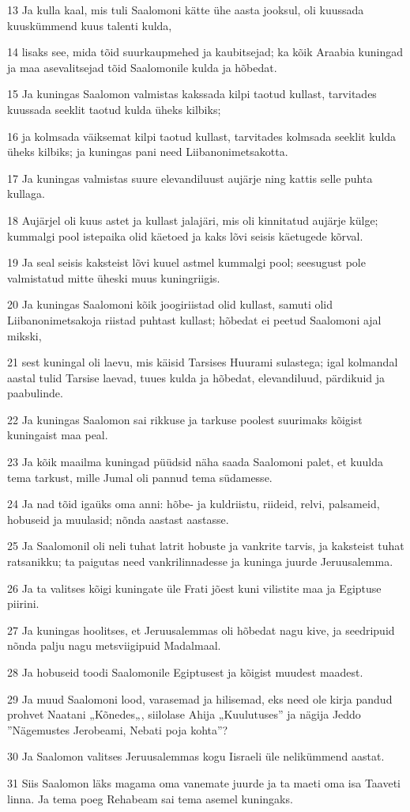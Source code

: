 \par 13 Ja kulla kaal, mis tuli Saalomoni kätte ühe aasta jooksul, oli kuussada kuuskümmend kuus talenti kulda,
\par 14 lisaks see, mida tõid suurkaupmehed ja kaubitsejad; ka kõik Araabia kuningad ja maa asevalitsejad tõid Saalomonile kulda ja hõbedat.
\par 15 Ja kuningas Saalomon valmistas kakssada kilpi taotud kullast, tarvitades kuussada seeklit taotud kulda üheks kilbiks;
\par 16 ja kolmsada väiksemat kilpi taotud kullast, tarvitades kolmsada seeklit kulda üheks kilbiks; ja kuningas pani need Liibanonimetsakotta.
\par 17 Ja kuningas valmistas suure elevandiluust aujärje ning kattis selle puhta kullaga.
\par 18 Aujärjel oli kuus astet ja kullast jalajäri, mis oli kinnitatud aujärje külge; kummalgi pool istepaika olid käetoed ja kaks lõvi seisis käetugede kõrval.
\par 19 Ja seal seisis kaksteist lõvi kuuel astmel kummalgi pool; seesugust pole valmistatud mitte üheski muus kuningriigis.
\par 20 Ja kuningas Saalomoni kõik joogiriistad olid kullast, samuti olid Liibanonimetsakoja riistad puhtast kullast; hõbedat ei peetud Saalomoni ajal mikski,
\par 21 sest kuningal oli laevu, mis käisid Tarsises Huurami sulastega; igal kolmandal aastal tulid Tarsise laevad, tuues kulda ja hõbedat, elevandiluud, pärdikuid ja paabulinde.
\par 22 Ja kuningas Saalomon sai rikkuse ja tarkuse poolest suurimaks kõigist kuningaist maa peal.
\par 23 Ja kõik maailma kuningad püüdsid näha saada Saalomoni palet, et kuulda tema tarkust, mille Jumal oli pannud tema südamesse.
\par 24 Ja nad tõid igaüks oma anni: hõbe- ja kuldriistu, riideid, relvi, palsameid, hobuseid ja muulasid; nõnda aastast aastasse.
\par 25 Ja Saalomonil oli neli tuhat latrit hobuste ja vankrite tarvis, ja kaksteist tuhat ratsanikku; ta paigutas need vankrilinnadesse ja kuninga juurde Jeruusalemma.
\par 26 Ja ta valitses kõigi kuningate üle Frati jõest kuni vilistite maa ja Egiptuse piirini.
\par 27 Ja kuningas hoolitses, et Jeruusalemmas oli hõbedat nagu kive, ja seedripuid nõnda palju nagu metsviigipuid Madalmaal.
\par 28 Ja hobuseid toodi Saalomonile Egiptusest ja kõigist muudest maadest.
\par 29 Ja muud Saalomoni lood, varasemad ja hilisemad, eks need ole kirja pandud prohvet Naatani „Kõnedes„, siilolase Ahija „Kuulutuses” ja nägija Jeddo ”Nägemustes Jerobeami, Nebati poja kohta”?
\par 30 Ja Saalomon valitses Jeruusalemmas kogu Iisraeli üle nelikümmend aastat.
\par 31 Siis Saalomon läks magama oma vanemate juurde ja ta maeti oma isa Taaveti linna. Ja tema poeg Rehabeam sai tema asemel kuningaks.

